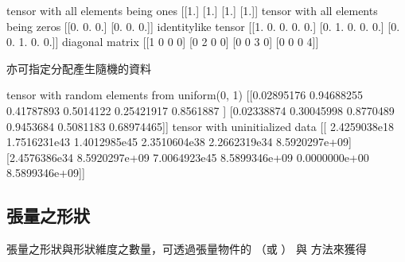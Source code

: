 \documentclass[letterpaper,10pt,english]{sphinxmanual}
\begin{document}
\begin{sphinxVerbatim}[commandchars=\\\{\}]
tensor with all elements being ones 
 [[1.]
 [1.]
 [1.]
 [1.]]
tensor with all elements being zeros 
 [[0. 0. 0.]
 [0. 0. 0.]]
identity\PYGZhy{}like tensor 
 [[1. 0. 0. 0. 0.]
 [0. 1. 0. 0. 0.]
 [0. 0. 1. 0. 0.]]
diagonal matrix 
 [[1 0 0 0]
 [0 2 0 0]
 [0 0 3 0]
 [0 0 0 4]]
\end{sphinxVerbatim}

 亦可指定分配產生隨機的資料

\begin{sphinxVerbatim}[commandchars=\\\{\}]
         
         
\end{sphinxVerbatim}

\begin{sphinxVerbatim}[commandchars=\\\{\}]
tensor with random elements from uniform(0, 1) 
 [[0.02895176 0.94688255 0.41787893 0.5014122  0.25421917 0.8561887 ]
 [0.02338874 0.30045998 0.8770489  0.9453684  0.5081183  0.68974465]]
tensor with uninitialized data 
 [[ 2.4259038e\PYGZhy{}18  1.7516231e\PYGZhy{}43  1.4012985e\PYGZhy{}45  2.3510604e\PYGZhy{}38
  \PYGZhy{}2.2662319e\PYGZhy{}34 \PYGZhy{}8.5920297e+09]
 [\PYGZhy{}2.4576386e\PYGZhy{}34 \PYGZhy{}8.5920297e+09  7.0064923e\PYGZhy{}45 \PYGZhy{}8.5899346e+09
   0.0000000e+00 \PYGZhy{}8.5899346e+09]]
\end{sphinxVerbatim}


\subsection{張量之形狀}
\label{\detokenize{notebook/lab-torch-tensor:id4}}
張量之形狀與形狀維度之數量，可透過張量物件的 （或 ） 與  方法來獲得
\end{document}
